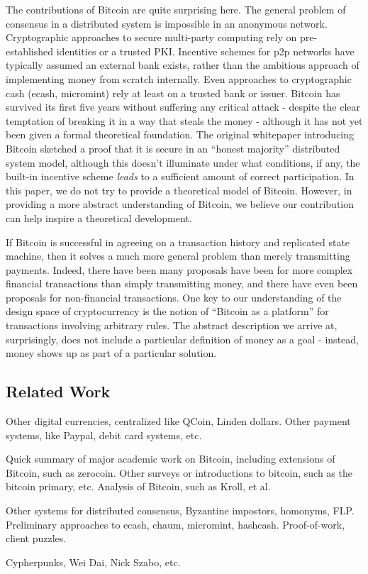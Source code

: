 The contributions of Bitcoin are quite surprising here. The general problem of consensus in a distributed system is impossible in an anonymous network. Cryptographic approaches to secure multi-party computing rely on pre-established identities or a trusted PKI. Incentive schemes for p2p networks have typically assumed an external bank exists, rather than the ambitious approach of implementing money from scratch internally. Even approaches to cryptographic cash (ecash, micromint) rely at least on a trusted bank or issuer. Bitcoin has survived its first five years without suffering any critical attack - despite the clear temptation of breaking it in a way that steals the money - although it has not yet been given a formal theoretical foundation. The original whitepaper introducing Bitcoin sketched a proof that it is secure in an ``honest majority'' distributed system model, although this doesn't illuminate under what conditions, if any, the built-in incentive scheme {\em leads} to a sufficient amount of correct participation. In this paper, we do not try to provide a theoretical model of Bitcoin. However, in providing a more abstract understanding of Bitcoin, we believe our contribution can help inspire a theoretical development. 

If Bitcoin is successful in agreeing on a transaction history and replicated state machine, then it solves a much more general problem than merely transmitting payments. Indeed, there have been many proposals have been for more complex financial transactions than simply transmitting money, and there have even been proposals for non-financial transactions. One key to our understanding of the design space of cryptocurrency is the notion of ``Bitcoin as a platform'' for transactions involving arbitrary rules. The abstract description we arrive at, surprisingly, does not include a particular definition of money as a goal - instead, money shows up as part of a particular solution.

\subsection{Related Work}

Other digital currencies, centralized like QCoin, Linden dollars. Other payment systems, like Paypal, debit card systems, etc.

Quick summary of major academic work on Bitcoin, including extensions of Bitcoin, such as zerocoin. Other surveys or introductions to bitcoin, such as the bitcoin primary, etc. Analysis of Bitcoin, such as Kroll, et al.

Other systems for distributed consensus, Byzantine impostors, homonyms, FLP. Preliminary approaches to ecash, chaum, micromint, hashcash.
Proof-of-work, client puzzles.

Cypherpunks, Wei Dai, Nick Szabo, etc.
